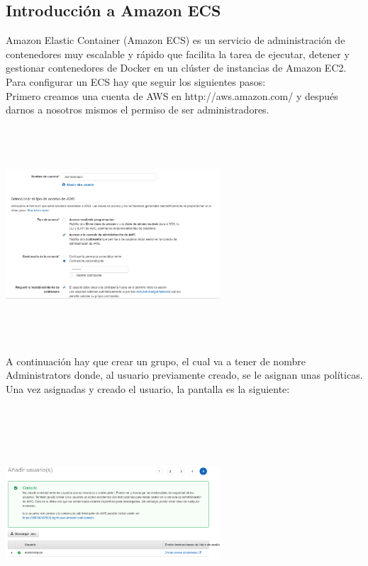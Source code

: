\documentclass[english,runningheads,a4paper]{llncs}[2018/03/10]
\newenvironment{nscenter}
 {\parskip=0pt\par\nopagebreak\centering}
 {\par\noindent\ignorespacesafterend}
\begin{document}
\subsection*{Introducción a Amazon ECS}
Amazon Elastic Container (Amazon ECS) es un servicio de administración de 
contenedores muy escalable y rápido que facilita la tarea de ejecutar, detener 
y gestionar contenedores de Docker en un clúster de instancias de Amazon EC2.\\
Para configurar un ECS hay que seguir los siguientes pasos: \\
Primero creamos una cuenta de AWS en http://aws.amazon.com/ y después darnos a 
nosotros mismos el permiso de ser administradores.
\begin{nscenter}
\includegraphics[width=8cm,height=8cm,keepaspectratio]{./Contenedores/AWS/28.png}
\end{nscenter}
\newline
A continuación hay que crear un grupo, el cual va a tener de nombre 
Administrators donde, al usuario previamente creado, se le asignan unas 
políticas. \\
Una vez asignadas y creado el usuario, la pantalla es la siguiente: 
\newline
\begin{nscenter}
\includegraphics[width=8cm,height=8cm,keepaspectratio]{./Contenedores/AWS/29.png}
\end{nscenter}
\end{document}
